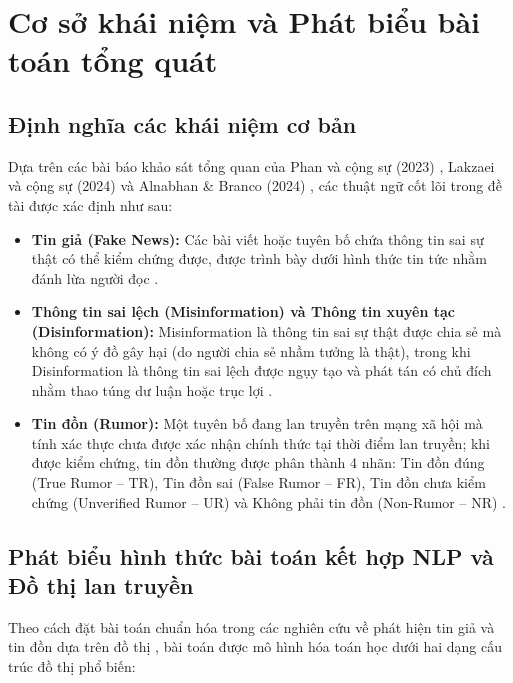 \documentclass[11pt,a4paper]{extreport}
\begin{document}
\section{Cơ sở khái niệm và Phát biểu bài toán tổng quát}

\subsection{Định nghĩa các khái niệm cơ bản}
Dựa trên các bài báo khảo sát tổng quan của Phan và cộng sự (2023) \cite{noauthor_fake_2023}, Lakzaei và cộng sự (2024) \cite{noauthor_disinformation_2024} và Alnabhan \& Branco (2024) \cite{noauthor_fake_2024}, các thuật ngữ cốt lõi trong đề tài được xác định như sau:
\begin{itemize}
    \item \textbf{Tin giả (Fake News):} Các bài viết hoặc tuyên bố chứa thông tin sai sự thật có thể kiểm chứng được, được trình bày dưới hình thức tin tức nhằm đánh lừa người đọc \cite{noauthor_dual_2025, noauthor_hybrid_2025}.
    \item \textbf{Thông tin sai lệch (Misinformation) và Thông tin xuyên tạc (Disinformation):} Misinformation là thông tin sai sự thật được chia sẻ mà không có ý đồ gây hại (do người chia sẻ nhầm tưởng là thật), trong khi Disinformation là thông tin sai lệch được ngụy tạo và phát tán có chủ đích nhằm thao túng dư luận hoặc trục lợi \cite{noauthor_disinformation_2024, noauthor_comparative_2024}.
    \item \textbf{Tin đồn (Rumor):} Một tuyên bố đang lan truyền trên mạng xã hội mà tính xác thực chưa được xác nhận chính thức tại thời điểm lan truyền; khi được kiểm chứng, tin đồn thường được phân thành 4 nhãn: Tin đồn đúng (True Rumor -- TR), Tin đồn sai (False Rumor -- FR), Tin đồn chưa kiểm chứng (Unverified Rumor -- UR) và Không phải tin đồn (Non-Rumor -- NR) \cite{noauthor_disinformation_2024, noauthor_heterogeneous_2025, noauthor_integrating_2025}.
\end{itemize}

\subsection{Phát biểu hình thức bài toán kết hợp NLP và Đồ thị lan truyền}
Theo cách đặt bài toán chuẩn hóa trong các nghiên cứu về phát hiện tin giả và tin đồn dựa trên đồ thị \cite{noauthor_exploiting_2024, noauthor_heterogeneous_2025, noauthor_integrating_2025, cui_graph_2025}, bài toán được mô hình hóa toán học dưới hai dạng cấu trúc đồ thị phổ biến:
\end{document}
